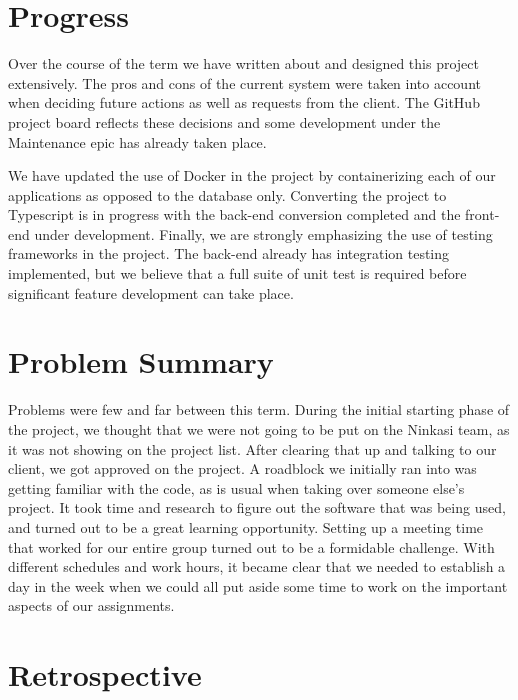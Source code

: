 \documentclass[draftclsnofoot,onecolumn,journal,letterpaper,compsoc,10pt]{IEEEtran}
\begin{document}
\section{Progress}
Over the course of the term we have written about and designed this project extensively. The pros and cons of the current system were taken into account when deciding future actions as well as requests from the client. The GitHub project board reflects these decisions and some development under the Maintenance epic has already taken place.

We have updated the use of Docker in the project by containerizing each of our applications as opposed to the database only. Converting the project to Typescript is in progress with the back-end conversion completed and the front-end under development. Finally, we are strongly emphasizing the use of testing frameworks in the project. The back-end already has integration testing implemented, but we believe that a full suite of unit test is required before significant feature development can take place.

\section{Problem Summary}
    Problems were few and far between this term. During the initial starting phase of the project, we thought that we were not going to be put on the Ninkasi team, as it was not showing on the project list. After clearing that up and talking to our client, we got approved on the project. 
    A roadblock we initially ran into was getting familiar with the code, as is usual when taking over someone else's project. It took time and research to figure out the software that was being used, and turned out to be a great learning opportunity.
    Setting up a meeting time that worked for our entire group turned out to be a formidable challenge. With different schedules and work hours, it became clear that we needed to establish a day in the week when we could all put aside some time to work on the important aspects of our assignments.


\section{Retrospective}
\end{document}
